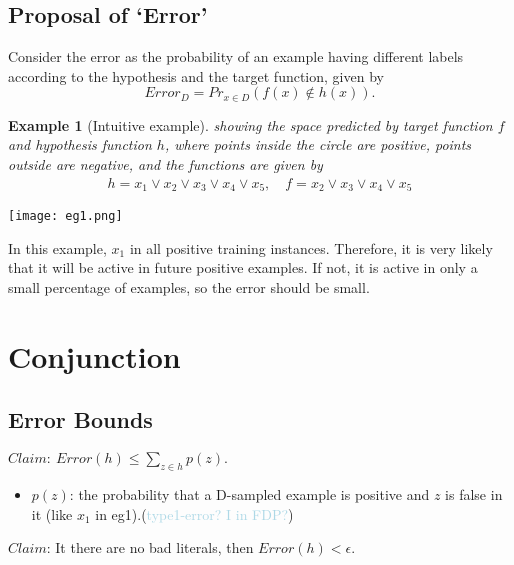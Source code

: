 \documentclass[12pt, a4paper, oneside]{article}
\newtheorem{example}[theorem]{Example}
\begin{document}
\subsection{Proposal of ‘Error’}
Consider the error as the probability of an example having different labels according to the hypothesis and the target function, given by
\begin{equation*}
    Error_D = Pr_{x \in D}(f(x) \notin h(x)).
\end{equation*}

\begin{example}[Intuitive example]
    showing the space predicted by target function $f$ and hypothesis function $h$, where points inside the circle are positive, points outside are negative, and the functions are given by
    \begin{gather*}
        h = x_1 \vee x_2 \vee x_3 \vee x_4 \vee x_5, \quad f = x_2 \vee x_3 \vee x_4 \vee x_5
    \end{gather*}
\end{example}
\begin{figure*}[h]
    \centering %
    \texttt{[image: eg1.png]} %
\end{figure*}
In this example, $x_1$ in all positive training instances. Therefore, it is very likely that it will be active in future positive examples. If not, it is active in only a small percentage of examples, so the error should be small.

\section{Conjunction}
\subsection{Error Bounds}
$Claim: \ Error(h) \leq \sum_{z\in h} p(z).$
\begin{itemize}
    \item $p(z)$: the probability that a D-sampled example is positive and $z$ is false in it (like $x_1$ in eg1).(\textcolor{lightBlue}{type1-error? I in FDP?})
\end{itemize}
$Claim $: It there are no bad literals, then $Error(h) < \epsilon.$
\end{document}
